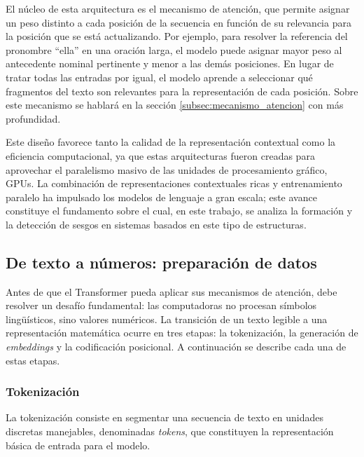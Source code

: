 \documentclass[12pt,a4paper]{report}
\begin{document}
El núcleo de esta arquitectura es el mecanismo de atención, que permite asignar un peso distinto a cada posición de la secuencia en función de su relevancia para la posición que se 
está actualizando. Por ejemplo, para resolver la referencia del pronombre ``ella'' en una oración larga, el modelo puede asignar mayor peso al antecedente nominal pertinente y 
menor a las demás posiciones. En lugar de tratar todas las entradas por igual, el modelo aprende a seleccionar qué fragmentos del texto son relevantes para la representación de 
cada posición. Sobre este mecanismo se hablará en la sección \autoref{subsec:mecanismo_atencion} con más profundidad.

Este diseño favorece tanto la calidad de la representación contextual como la eficiencia computacional, ya que estas arquitecturas 
fueron creadas para aprovechar el paralelismo masivo de las unidades de procesamiento gráfico, GPUs. La combinación de representaciones 
contextuales ricas y entrenamiento paralelo ha impulsado los modelos de lenguaje a gran escala; este avance constituye el 
fundamento sobre el cual, en este trabajo, se analiza la formación y la detección de sesgos en sistemas basados en este tipo de estructuras.

\subsection{De texto a números: preparación de datos}
\label{subsec:preparacion_datos_transformer}

Antes de que el Transformer pueda aplicar sus mecanismos de atención, debe resolver un desafío fundamental: las computadoras no procesan símbolos lingüísticos, sino valores numéricos. La transición de un texto legible a una representación matemática ocurre en tres etapas: la tokenización, la generación de \textit{embeddings} y la codificación posicional. A continuación se describe cada una de estas etapas.

\subsubsection{Tokenización}
\label{subsubsec:tokenizacion}

La tokenización consiste en segmentar una secuencia de texto en unidades discretas manejables, denominadas \textit{tokens}, que constituyen la representación básica de entrada para el modelo.
\end{document}
